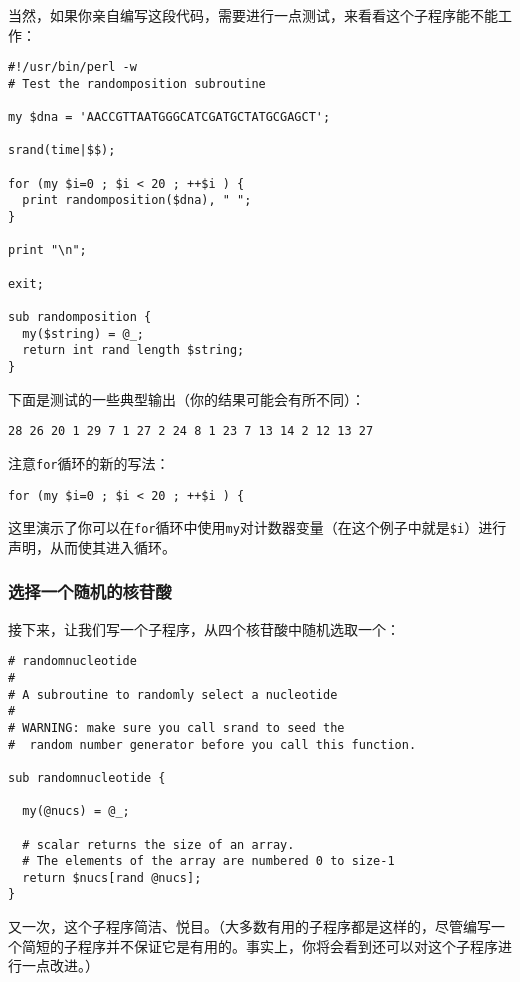 当然，如果你亲自编写这段代码，需要进行一点测试，来看看这个子程序能不能工作：

\begin{lstlisting}
#!/usr/bin/perl -w
# Test the randomposition subroutine

my $dna = 'AACCGTTAATGGGCATCGATGCTATGCGAGCT';

srand(time|$$);

for (my $i=0 ; $i < 20 ; ++$i ) {
  print randomposition($dna), " ";
}

print "\n";

exit;

sub randomposition {
  my($string) = @_;
  return int rand length $string;
}
\end{lstlisting}

下面是测试的一些典型输出（你的结果可能会有所不同）：

\begin{lstlisting}
28 26 20 1 29 7 1 27 2 24 8 1 23 7 13 14 2 12 13 27 
\end{lstlisting}

注意\verb|for|循环的新的写法：

\begin{lstlisting}
for (my $i=0 ; $i < 20 ; ++$i ) {
\end{lstlisting}

这里演示了你可以在\verb|for|循环中使用\verb|my|对计数器变量（在这个例子中就是\verb|$i|）进行声明，从而使其进入循环。

\subsubsection{选择一个随机的核苷酸}
接下来，让我们写一个子程序，从四个核苷酸中随机选取一个：

\begin{lstlisting}
# randomnucleotide
#
# A subroutine to randomly select a nucleotide
#
# WARNING: make sure you call srand to seed the
#  random number generator before you call this function.

sub randomnucleotide {

  my(@nucs) = @_;

  # scalar returns the size of an array. 
  # The elements of the array are numbered 0 to size-1
  return $nucs[rand @nucs];
}
\end{lstlisting}

又一次，这个子程序简洁、悦目。（大多数有用的子程序都是这样的，尽管编写一个简短的子程序并不保证它是有用的。事实上，你将会看到还可以对这个子程序进行一点改进。）

